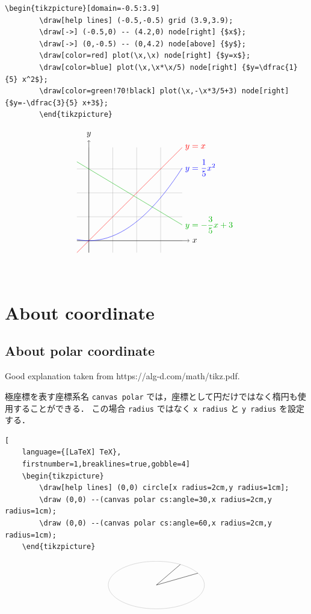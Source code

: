\documentclass[lualatex]{jlreq}
\begin{document}
\begin{minipage}{0.48 \textwidth}
    \begin{lstlisting}[language={[LaTeX] TeX},
        firstnumber=1,breaklines=true,gobble=8]
        \begin{tikzpicture}[domain=-0.5:3.9]
        \draw[help lines] (-0.5,-0.5) grid (3.9,3.9);
        \draw[->] (-0.5,0) -- (4.2,0) node[right] {$x$};
        \draw[->] (0,-0.5) -- (0,4.2) node[above] {$y$};
        \draw[color=red] plot(\x,\x) node[right] {$y=x$};
        \draw[color=blue] plot(\x,\x*\x/5) node[right] {$y=\dfrac{1}{5} x^2$};
        \draw[color=green!70!black] plot(\x,-\x*3/5+3) node[right] {$y=-\dfrac{3}{5} x+3$};
        \end{tikzpicture}
\end{lstlisting}
\end{minipage}
\hfill
\begin{minipage}{0.48 \textwidth}
    \[
        \begin{tikzpicture}[domain=-0.5:3.9]
        \draw[help lines] (-0.5,-0.5) grid (3.9,3.9);
        \draw[->] (-0.5,0) -- (4.2,0) node[right] {$x$};
        \draw[->] (0,-0.5) -- (0,4.2) node[above] {$y$};
        \draw[color=red] plot(\x,\x) node[right] {$y=x$};
        \draw[color=blue] plot(\x,\x*\x/5) node[right] {$y=\dfrac{1}{5} x^2$};
        \draw[color=green!70!black] plot(\x,-\x*3/5+3) node[right] {$y=-\dfrac{3}{5} x+3$};
        \end{tikzpicture}
    \]
\end{minipage}
\\[1em]

\section{About coordinate}

\subsection{About polar coordinate}

Good explanation taken from https://alg-d.com/math/tikz.pdf.

極座標を表す座標系名 \verb|canvas polar| では，座標として円だけではなく楕円も使用することができる．
この場合 \verb|radius| ではなく \verb|x radius| と \verb|y radius| を設定する．
\begin{lstlisting}[
    language={[LaTeX] TeX},
    firstnumber=1,breaklines=true,gobble=4]
    \begin{tikzpicture}
        \draw[help lines] (0,0) circle[x radius=2cm,y radius=1cm];
        \draw (0,0) --(canvas polar cs:angle=30,x radius=2cm,y radius=1cm);
        \draw (0,0) --(canvas polar cs:angle=60,x radius=2cm,y radius=1cm);
    \end{tikzpicture}
\end{lstlisting}
\[
    \begin{tikzpicture}
        \draw[help lines] (0,0) circle[x radius=2cm,y radius=1cm];
        \draw (0,0) --(canvas polar cs:angle=30,x radius=2cm,y radius=1cm);
        \draw (0,0) --(canvas polar cs:angle=60,x radius=2cm,y radius=1cm);
    \end{tikzpicture}
\]
\end{document}
